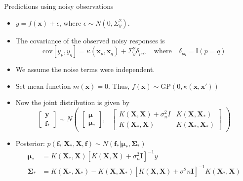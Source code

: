 \documentclass[10pt,mathserif]{beamer}
\begin{document}
\begin{frame}{Predictions using noisy observations}
\begin{itemize}
    \item $y = f(\bm{x}) + \epsilon$, where $\epsilon \sim N (0, \Sigma_y^2)$.
    \item The covariance of the observed noisy responses is 
    \begin{equation*}
        \text{cov} [y_p, y_q] = \kappa(\bm{x}_p, \bm{x}_q) + \Sigma_y^2 \delta_{pq}, \quad \text{where}\quad \delta_{pq} = \mathbb{I}(p = q)
    \end{equation*}
    \item We assume the noise terms were independent.
    \item Set mean function $m(\bm{x}) = 0$. Thus, $f(\bm{x}) \sim \text{GP}(0, \kappa(\bm{x}, \bm{x}'))$
    \item Now the joint distribution is given by
    \begin{equation*}
        \begin{bmatrix}
        \bm{y}\\
        \bm{f}_*
        \end{bmatrix} 
         \sim N
        \begin{pmatrix}
            \begin{bmatrix}
            \bm{\mu}\\
            \bm{\mu}_*
            \end{bmatrix}\!\!,&
            \begin{bmatrix}
            K(\bm{X}, \bm{X}) + \sigma^2_nI & K(\bm{X}, \bm{X}_*)\\
            K(\bm{X}_*, \bm{X}) & K(\bm{X}_*, \bm{X}_*)
            \end{bmatrix}
        \end{pmatrix}
    \end{equation*}
    \item Posterior: $ p(\bm{f}_*|\bm{X}_*, \bm{X},\bm{f}) \sim N (\bm{f}_*|\bm{\mu}_*, \bm{\Sigma}_*) $
    \begin{equation*}
        \begin{split}
            \bm{\mu}_* &   = K(\bm{X}_*, \bm{X}) [K(\bm{X}, \bm{X}) + \sigma^2_n\bm{I}]^{-1}y \\
            \bm{\Sigma}_* &  = K(\bm{X}_*, \bm{X}_*) - K(\bm{X}, \bm{X}_*) [K(\bm{X}, \bm{X}) + \sigma^2n\bm{I}]^{-1} K(\bm{X}_*, \bm{X})
        \end{split}
    \end{equation*} 
\end{itemize}      
\end{frame}
\end{document}
